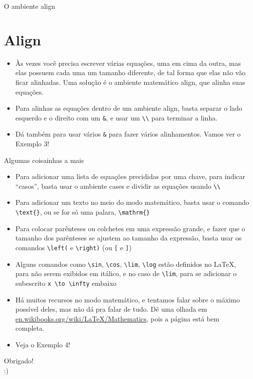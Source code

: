\documentclass[12pt]{beamer}
\begin{document}
\begin{frame}[fragile]{O ambiente align}
  \section{Align}
  \begin{itemize}
    \item Às vezes você precisa escrever várias equações, uma em cima da outra, mas elas possuem cada uma um tamanho diferente, de tal forma que elas não vão ficar alinhadas. Uma solução é o ambiente matemático align, que alinha suas equações.
    \item Para alinhas as equações dentro de um ambiente align, basta separar o lado esquerdo e o direito com um \verb+&+, e usar um \verb+\\+ para terminar a linha.
    \item Dá também para usar vários \verb+&+ para fazer vários alinhamentos. Vamos ver o Exemplo 3!
  \end{itemize}

\end{frame}

\begin{frame}[fragile]{Algumas coisainhas a mais}
  \begin{itemize}
    \item Para adicionar uma lista de equações precididas por uma chave, para indicar ``casos'', basta usar o ambiente cases e dividir as equações usando \verb+\\+
    \item Para adicionar um texto no meio do modo matemático, basta usar o comando \verb+\text{}+, ou se for só uma palara, \verb+\mathrm{}+
    \item Para colocar parênteses ou colchetes em uma expressão grande, e fazer que o tamanho dos parênteses se ajustem ao tamanho da expressão, basta usar os comandos \verb+\left(+ e \verb+\right)+ (ou \verb+[+ e \verb+]+)
  \end{itemize}
\end{frame}

\begin{frame}[fragile]
  \begin{itemize}
    \item Alguns comandos como \verb+\sin+, \verb+\cos+, \verb+\lim+, \verb+\log+ estão definidos no \LaTeX, para não serem exibidos em itálico, e no caso de \verb+\lim+, para se adicionar o subescrito \verb+x \to \infty+ embaixo
    \item Há muitos recursos no modo matemático, e tentamos falar sobre o máximo possível deles, mas não dá pra falar de tudo. Dê uma olhada em \url{en.wikibooks.org/wiki/LaTeX/Mathematics},
    pois a página está bem completa.
    \item Veja o Exemplo 4!
  \end{itemize}
\end{frame}

\begin{frame}
  \begin{center}
    \large Obrigado!\\
    :)
  \end{center}
\end{frame}
\end{document}
